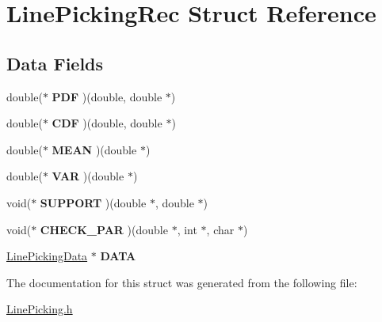 \hypertarget{struct_line_picking_rec}{\section{Line\-Picking\-Rec Struct Reference}
\label{struct_line_picking_rec}
}
\subsection*{Data Fields}
\begin{DoxyCompactItemize}
\item 
\hypertarget{struct_line_picking_rec_ae771b5624dc57ea73c6d5059f02251f5}{double($\ast$ {\bfseries P\-D\-F} )(double, double $\ast$)}\label{struct_line_picking_rec_ae771b5624dc57ea73c6d5059f02251f5}

\item 
\hypertarget{struct_line_picking_rec_a35f0d15618ffe567bcc326a076bb8c72}{double($\ast$ {\bfseries C\-D\-F} )(double, double $\ast$)}\label{struct_line_picking_rec_a35f0d15618ffe567bcc326a076bb8c72}

\item 
\hypertarget{struct_line_picking_rec_a31998c790987df0319a5cec680a2f2ae}{double($\ast$ {\bfseries M\-E\-A\-N} )(double $\ast$)}\label{struct_line_picking_rec_a31998c790987df0319a5cec680a2f2ae}

\item 
\hypertarget{struct_line_picking_rec_ad0b3c8bc8be454fcba65a153181e5dee}{double($\ast$ {\bfseries V\-A\-R} )(double $\ast$)}\label{struct_line_picking_rec_ad0b3c8bc8be454fcba65a153181e5dee}

\item 
\hypertarget{struct_line_picking_rec_a800220d7d26db4a7c3dfd083a1f1f9ab}{void($\ast$ {\bfseries S\-U\-P\-P\-O\-R\-T} )(double $\ast$, double $\ast$)}\label{struct_line_picking_rec_a800220d7d26db4a7c3dfd083a1f1f9ab}

\item 
\hypertarget{struct_line_picking_rec_a9ae62d7891ffd81baf6c300e07f70f3b}{void($\ast$ {\bfseries C\-H\-E\-C\-K\-\_\-\-P\-A\-R} )(double $\ast$, int $\ast$, char $\ast$)}\label{struct_line_picking_rec_a9ae62d7891ffd81baf6c300e07f70f3b}

\item 
\hypertarget{struct_line_picking_rec_abe5b63d6b58ae9d52a9c7b827375641e}{\hyperlink{struct_line_picking_data}{Line\-Picking\-Data} $\ast$ {\bfseries D\-A\-T\-A}}\label{struct_line_picking_rec_abe5b63d6b58ae9d52a9c7b827375641e}

\end{DoxyCompactItemize}


The documentation for this struct was generated from the following file\-:\begin{DoxyCompactItemize}
\item 
\hyperlink{_line_picking_8h}{Line\-Picking.\-h}\end{DoxyCompactItemize}

